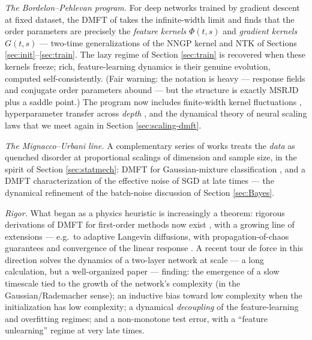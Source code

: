 \documentclass[11pt]{article}
\begin{document}
\emph{The Bordelon--Pehlevan program.} For deep networks trained by gradient descent at fixed dataset, the DMFT of \cite{bordelon2022self} takes the infinite-width limit and finds that the order parameters are precisely the \emph{feature kernels} $\Phi(t,s)$ and \emph{gradient kernels} $G(t,s)$ --- two-time generalizations of the NNGP kernel and NTK of Sections \ref{sec:init}--\ref{sec:train}. The lazy regime of Section \ref{sec:train} is recovered when these kernels freeze; rich, feature-learning dynamics is their genuine evolution, computed self-consistently. (Fair warning: the notation is heavy --- response fields and conjugate order parameters abound --- but the structure is exactly MSRJD plus a saddle point.) The program now includes finite-width kernel fluctuations \cite{bordelonDynamicsFiniteWidth2023}, hyperparameter transfer across \emph{depth} \cite{bordelonDepthwiseHyperparameterTransfer2023}, and the dynamical theory of neural scaling laws \cite{bordelon2024dynamical} that we meet again in Section \ref{sec:scaling-dmft}.

\emph{The Mignacco--Urbani line.} A complementary series of works treats the \emph{data} as quenched disorder at proportional scalings of dimension and sample size, in the spirit of Section \ref{sec:statmech}: DMFT for Gaussian-mixture classification \cite{mignaccoDynamicalMeanfieldTheory2021}, and a DMFT characterization of the effective noise of SGD at late times \cite{mignaccoEffectiveNoiseStochastic2022} --- the dynamical refinement of the batch-noise discussion of Section \ref{sec:Bayes}.

\emph{Rigor.} What began as a physics heuristic is increasingly a theorem: rigorous derivations of DMFT for first-order methods now exist \cite{celentano2021high,gerbelot2024rigorous}, with a growing line of extensions --- e.g.\ to adaptive Langevin diffusions, with propagation-of-chaos guarantees and convergence of the linear response \cite{fan2025adaptive}. A recent tour de force in this direction \cite{montanariDynamicalDecouplingGeneralization2025} solves the dynamics of a two-layer network at scale --- a long calculation, but a well-organized paper --- finding: the emergence of a slow timescale tied to the growth of the network's complexity (in the Gaussian/Rademacher sense); an inductive bias toward low complexity when the initialization has low complexity; a dynamical \emph{decoupling} of the feature-learning and overfitting regimes; and a non-monotone test error, with a ``feature unlearning'' regime at very late times.
\end{document}
